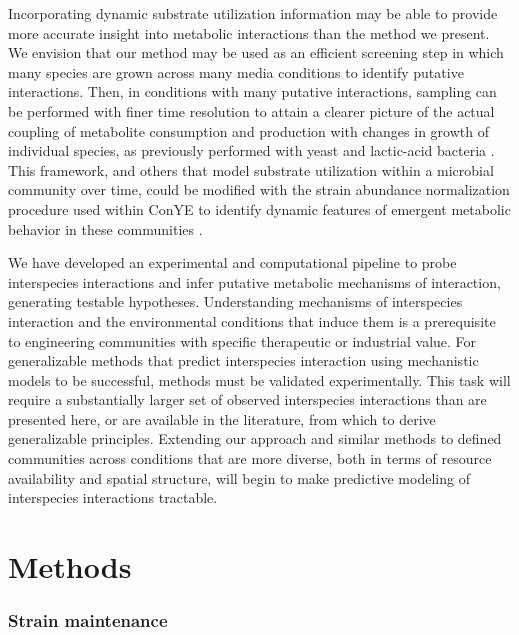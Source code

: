 \documentclass[11pt,twocolumn,notitlepage,openany,twoside]{book}
\begin{document}
\begin{refsection}
Incorporating dynamic substrate utilization information may be able to provide more accurate insight into metabolic interactions than the method we present. We envision that our method may be used as an efficient screening step in which many species are grown across many media conditions to identify putative interactions. Then, in conditions with many putative interactions, sampling can be performed with finer time resolution to attain a clearer picture of the actual coupling of metabolite consumption and production with changes in growth of individual species, as previously performed with yeast and lactic-acid bacteria \cite{Ponomarova2017-ob}. This framework, and others that model substrate utilization within a microbial community over time, could be modified with the strain abundance normalization procedure used within ConYE to identify dynamic features of emergent metabolic behavior in these communities \cite{Erbilgin2017-la}.

We have developed an experimental and computational pipeline to probe interspecies interactions and infer putative metabolic mechanisms of interaction, generating testable hypotheses.  Understanding mechanisms of interspecies interaction and the environmental conditions that induce them is a prerequisite to engineering communities with specific therapeutic or industrial value. For generalizable methods that predict interspecies interaction using mechanistic models to be successful, methods must be validated experimentally. This task will require a substantially larger set of observed interspecies interactions than are presented here, or are available in the literature, from which to derive generalizable principles. Extending our approach and similar methods to defined communities across conditions that are more diverse, both in terms of resource availability and spatial structure, will begin to make predictive modeling of interspecies interactions tractable.

\section{Methods}
\subsubsection{Strain maintenance}


\end{refsection}
\end{document}
